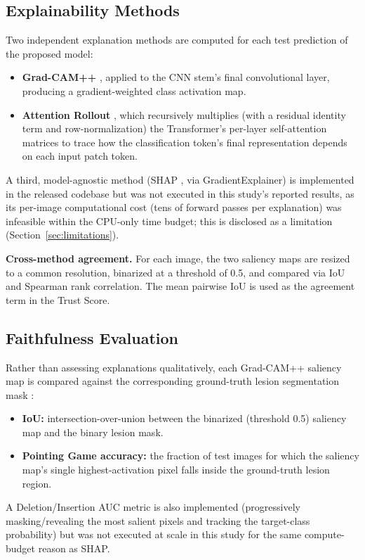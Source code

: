 \documentclass[conference]{IEEEtran}
\begin{document}
\subsection{Explainability Methods}

Two independent explanation methods are computed for each test prediction of the proposed
model:
\begin{itemize}
\item \textbf{Grad-CAM++} \cite{chattopadhyay2018}, applied to the CNN stem's final
convolutional layer, producing a gradient-weighted class activation map.
\item \textbf{Attention Rollout} \cite{abnar2020}, which recursively multiplies (with a
residual identity term and row-normalization) the Transformer's per-layer self-attention
matrices to trace how the classification token's final representation depends on each input
patch token.
\end{itemize}
A third, model-agnostic method (SHAP \cite{lundberg2017}, via GradientExplainer) is
implemented in the released codebase but was not executed in this study's reported results,
as its per-image computational cost (tens of forward passes per explanation) was infeasible
within the CPU-only time budget; this is disclosed as a limitation
(Section~\ref{sec:limitations}).

\textbf{Cross-method agreement.} For each image, the two saliency maps are resized to a
common resolution, binarized at a threshold of 0.5, and compared via IoU and Spearman rank
correlation. The mean pairwise IoU is used as the agreement term in the Trust Score.

\subsection{Faithfulness Evaluation}

Rather than assessing explanations qualitatively, each Grad-CAM++ saliency map is compared
against the corresponding ground-truth lesion segmentation mask \cite{tschandl2020}:
\begin{itemize}
\item \textbf{IoU:} intersection-over-union between the binarized (threshold 0.5) saliency
map and the binary lesion mask.
\item \textbf{Pointing Game accuracy:} the fraction of test images for which the saliency
map's single highest-activation pixel falls inside the ground-truth lesion region.
\end{itemize}
A Deletion/Insertion AUC metric \cite{petsiuk2018} is also implemented (progressively
masking/revealing the most salient pixels and tracking the target-class probability) but was
not executed at scale in this study for the same compute-budget reason as SHAP.
\end{document}
